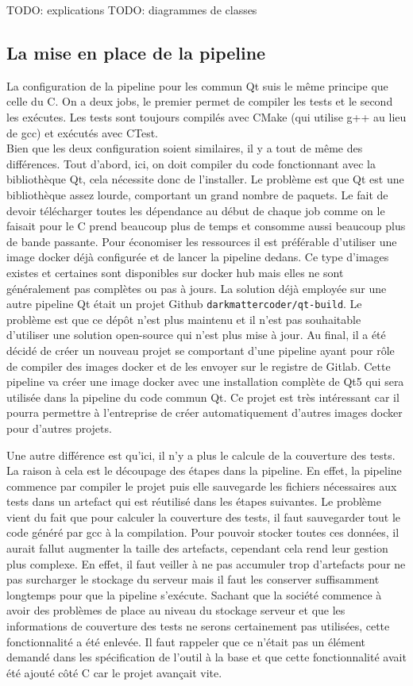 \documentclass[a4paper]{article}
\begin{document}
TODO: explications
TODO: diagrammes de classes

\subsection{La mise en place de la pipeline}

La configuration de la pipeline pour les commun Qt suis le même principe que
celle du C. On a deux jobs, le premier permet de compiler les tests et le second
les exécutes. Les tests sont toujours compilés avec CMake (qui utilise g++ au
lieu de gcc) et exécutés avec CTest.\\

Bien que les deux configuration soient similaires, il y a tout de même des
différences. Tout d'abord, ici, on doit compiler du code fonctionnant avec la
bibliothèque Qt, cela nécessite donc de l'installer. Le problème est que Qt est
une bibliothèque assez lourde, comportant un grand nombre de paquets. Le fait de
devoir télécharger toutes les dépendance au début de chaque job comme on le
faisait pour le C prend beaucoup plus de temps et consomme aussi beaucoup plus
de bande passante. Pour économiser les ressources il est préférable d'utiliser
une image docker déjà configurée et de lancer la pipeline dedans. Ce type
d'images existes et certaines sont disponibles sur docker hub mais elles ne sont
généralement pas complètes ou pas à jours. La solution déjà employée sur une
autre pipeline Qt était un projet Github \verb|darkmattercoder/qt-build|. Le
problème est que ce dépôt n'est plus maintenu et il n'est pas souhaitable
d'utiliser une solution open-source qui n'est plus mise à jour. Au final, il a
été décidé de créer un nouveau projet se comportant d'une pipeline ayant pour
rôle de compiler des images docker et de les envoyer sur le registre de Gitlab.
Cette pipeline va créer une image docker avec une installation complète de Qt5
qui sera utilisée dans la pipeline du code commun Qt. Ce projet est très
intéressant car il pourra permettre à l'entreprise de créer automatiquement
d'autres images docker pour d'autres projets.

Une autre différence est qu'ici, il n'y a plus le calcule de la couverture des
tests. La raison à cela est le découpage des étapes dans la pipeline. En effet,
la pipeline commence par compiler le projet puis elle sauvegarde les fichiers
nécessaires aux tests dans un artefact qui est réutilisé dans les étapes
suivantes. Le problème vient du fait que pour calculer la couverture des tests,
il faut sauvegarder tout le code généré par gcc à la compilation. Pour pouvoir
stocker toutes ces données, il aurait fallut augmenter la taille des artefacts,
cependant cela rend leur gestion plus complexe. En effet, il faut veiller à ne
pas accumuler trop d'artefacts pour ne pas surcharger le stockage du serveur
mais il faut les conserver suffisamment longtemps pour que la pipeline
s'exécute. Sachant que la société commence à avoir des problèmes de place au
niveau du stockage serveur et que les informations de couverture des tests ne
serons certainement pas utilisées, cette fonctionnalité a été enlevée. Il faut
rappeler que ce n'était pas un élément demandé dans les spécification de l'outil
à la base et que cette fonctionnalité avait été ajouté côté C car le projet
avançait vite.
\end{document}
